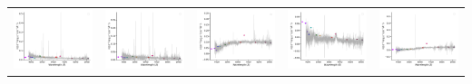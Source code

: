 \begin{center}
\begin{longtable}{l l l l l }
    \includegraphics[width=0.19\linewidth, clip]{Figs/Figs-sdss/spec-1474-52933-0189-STRIPE82-0129-024346.pdf} & \includegraphics[width=0.19\linewidth, clip]{Figs/Figs-sdss/spec-1474-52933-0296-STRIPE82-0127-008930.pdf} & \includegraphics[width=0.19\linewidth, clip]{Figs/Figs-sdss/spec-1475-52903-0561-STRIPE82-0134-039543.pdf} & \includegraphics[width=0.19\linewidth, clip]{Figs/Figs-sdss/spec-1492-52932-0553-STRIPE82-0010-005855.pdf} & \includegraphics[width=0.19\linewidth, clip]{Figs/Figs-sdss/spec-1493-52933-0207-STRIPE82-0011-008529.pdf} \\

\end{longtable}
\end{center}
